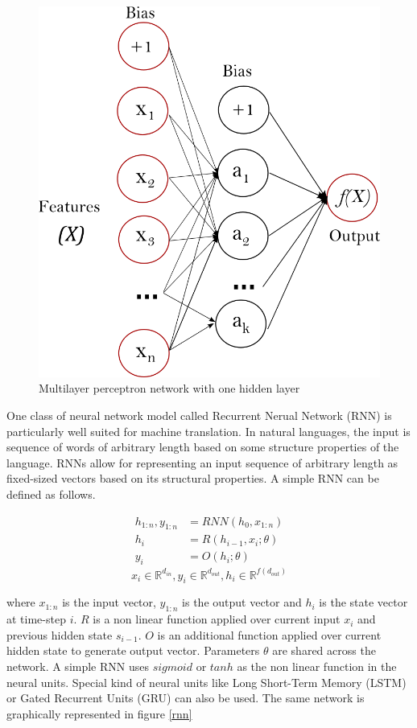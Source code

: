 \begin{figure}[ht]
	\centering
	\includegraphics{images/multilayerperceptron_network}
	\caption{Multilayer perceptron network with one hidden layer \citep{pedregosa2011scikit}}
	\label{mlp}
\end{figure}

One class of neural network model called Recurrent Nerual Network (RNN) \citep{elman1990finding} is particularly well suited for machine translation. In natural languages, the input is sequence of words of arbitrary length based on some structure properties of the language. RNNs allow for representing an input sequence of arbitrary length as fixed-sized vectors based on its structural properties. A simple RNN \citep{goldberg2016primer} can be defined as follows.

\begin{align*}
h_{1:n},  y_{1:n} &= RNN(h_0,x_{1:n}) \\
h_i &= R(h_{i-1},x_i;\theta) \\
y_i &= O(h_i;\theta)
\end{align*}
\[ 
x_i \in \mathbb{R}^{d_{in}}, y_i \in \mathbb{R}^{d_{out}}, h_i \in \mathbb{R}^{f({d_{out}})} \]

where $x_{1:n}$ is the input vector, $y_{1:n}$ is the output vector and $h_{i}$ is the state vector at time-step $i$. $R$ is a non linear function applied over current input $x_i$ and previous hidden state $s_{i-1}$. $O$ is an additional function applied over current hidden state to generate output vector.  Parameters $\theta$ are shared across the network. A simple RNN uses $sigmoid$ or $tanh$ as the non linear function in the neural units. Special kind of neural units like Long Short-Term Memory (LSTM) \citep{hochreiter1997long} or Gated Recurrent Units (GRU) \citep{cho2014learning} can also be used. The same network is graphically represented in figure \ref{rnn}


